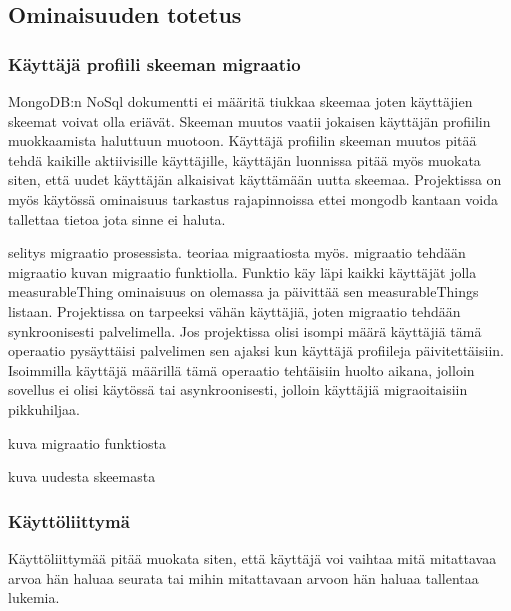 \subsection{Ominaisuuden totetus}


\subsubsection{Käyttäjä profiili skeeman migraatio}

MongoDB:n NoSql dokumentti ei määritä tiukkaa skeemaa joten käyttäjien skeemat voivat olla eriävät.
Skeeman muutos vaatii jokaisen käyttäjän profiilin muokkaamista haluttuun muotoon.
Käyttäjä profiilin skeeman muutos pitää tehdä kaikille aktiivisille käyttäjille, käyttäjän luonnissa pitää myös muokata siten, 
että uudet käyttäjän alkaisivat käyttämään uutta skeemaa.
Projektissa on myös käytössä ominaisuus tarkastus rajapinnoissa ettei mongodb kantaan voida tallettaa tietoa jota sinne ei haluta.
\medskip

selitys migraatio prosessista. teoriaa migraatiosta myös.
migraatio tehdään migraatio kuvan \nextImageCount {} migraatio funktiolla. 
Funktio käy läpi kaikki käyttäjät jolla measurableThing ominaisuus on olemassa ja päivittää sen measurableThings listaan.
Projektissa on tarpeeksi vähän käyttäjiä, joten migraatio tehdään synkroonisesti palvelimella. 
Jos projektissa olisi isompi määrä käyttäjiä tämä operaatio pysäyttäisi palvelimen sen ajaksi kun käyttäjä profiileja päivitettäisiin.
Isoimmilla käyttäjä määrillä tämä operaatio tehtäisiin huolto aikana, jolloin sovellus ei olisi käytössä tai asynkroonisesti, 
jolloin käyttäjiä migraoitaisiin pikkuhiljaa.


\bigskip

kuva migraatio funktiosta
\medskip

\bigskip


kuva uudesta skeemasta
\medskip









\subsubsection{Käyttöliittymä}

Käyttöliittymää pitää muokata siten,
että käyttäjä voi vaihtaa mitä mitattavaa arvoa hän haluaa seurata tai mihin mitattavaan arvoon hän haluaa tallentaa lukemia.

